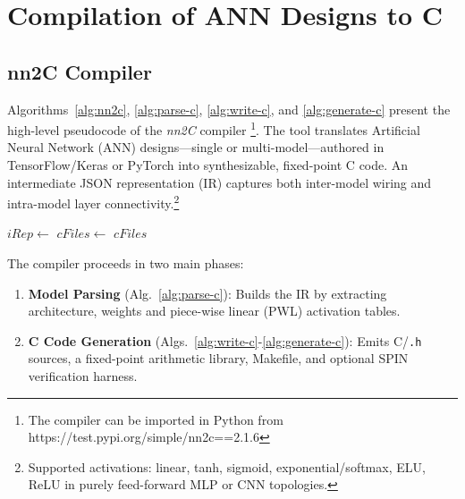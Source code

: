 \chapter{Compilation of ANN Designs to C}
\label{chapter:appendix_3}
\glsresetall

\section{nn2C Compiler}
Algorithms~\ref{alg:nn2c}, \ref{alg:parse-c}, \ref{alg:write-c}, and \ref{alg:generate-c} present the high-level pseudocode of the \emph{nn2C} compiler \footnote{The compiler can be imported in Python from https://test.pypi.org/simple/nn2c==2.1.6}.  
The tool translates Artificial Neural Network (ANN) designs—single or multi-model—authored in TensorFlow/Keras or PyTorch into synthesizable, fixed-point C code.   An intermediate JSON representation (IR) captures both inter-model wiring and intra-model layer connectivity.\footnote{Supported activations: linear, tanh, sigmoid, exponential/softmax, ELU, ReLU in purely feed-forward MLP or CNN topologies.}

\begin{algorithm}[htbp]
    \caption{Compile TensorFlow/PyTorch Models to C}\label{alg:nn2c}
    \begin{algorithmic}[1]
        \State $iRep \gets$ 
        \State $cFiles \gets$ 
        \State \Return $cFiles$
    \EndFunction
    \end{algorithmic}
\end{algorithm}

The compiler proceeds in two main phases:

\begin{enumerate}
  \item \textbf{Model Parsing} (Alg.~\ref{alg:parse-c}): Builds the IR by extracting architecture, weights and piece-wise linear (PWL) activation tables.
  \item \textbf{C Code Generation} (Algs.~\ref{alg:write-c}-\ref{alg:generate-c}): Emits C/\texttt{.h} sources, a fixed-point arithmetic library, Makefile, and optional SPIN verification harness.
\end{enumerate}

